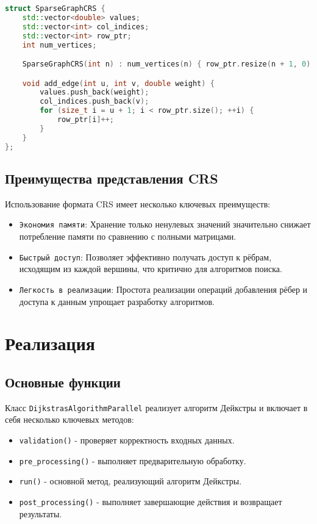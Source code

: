 \documentclass[12pt]{article}
\begin{document}
\begin{lstlisting}[language=c++, caption={Определение структуры SparseGraphCRS}]
struct SparseGraphCRS {
    std::vector<double> values;
    std::vector<int> col_indices;
    std::vector<int> row_ptr;
    int num_vertices;

    SparseGraphCRS(int n) : num_vertices(n) { row_ptr.resize(n + 1, 0); }

    void add_edge(int u, int v, double weight) {
        values.push_back(weight);
        col_indices.push_back(v);
        for (size_t i = u + 1; i < row_ptr.size(); ++i) {
            row_ptr[i]++;
        }
    }
};
\end{lstlisting}
\subsection{Преимущества представления CRS}
Использование формата CRS имеет несколько ключевых преимуществ:
\begin{itemize}
\item \texttt{Экономия памяти}: Хранение только ненулевых значений значительно снижает потребление памяти по сравнению с полными матрицами.
\item \texttt{Быстрый доступ}: Позволяет эффективно получать доступ к рёбрам, исходящим из каждой вершины, что критично для алгоритмов поиска.
\item \texttt{Легкость в реализации}: Простота реализации операций добавления рёбер и доступа к данным упрощает разработку алгоритмов.
\end{itemize}
\newpage
\section{Реализация}
\subsection{Основные функции}
Класс \texttt{DijkstrasAlgorithmParallel} реализует алгоритм Дейкстры и включает в себя несколько ключевых методов:
\begin{itemize}
    \item \texttt{validation()} - проверяет корректность входных данных.
    \item \texttt{pre\_processing()} - выполняет предварительную обработку.
    \item \texttt{run()} - основной метод, реализующий алгоритм Дейкстры.
    \item \texttt{post\_processing()} - выполняет завершающие действия и возвращает результаты.
\end{itemize}
\end{document}
